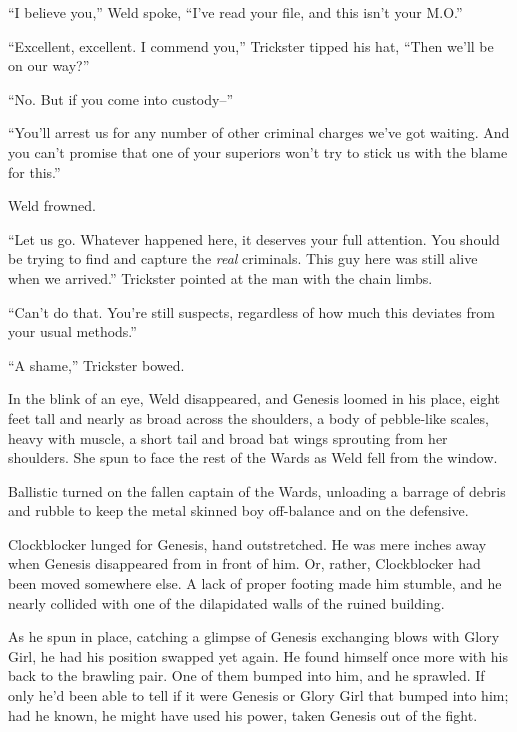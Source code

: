 ``I believe you,'' Weld spoke, ``I've read your file, and this isn't your M.O.''



``Excellent, excellent.  I commend you,'' Trickster tipped his hat, ``Then we'll be on our way?''



``No.  But if you come into custody--''



``You'll arrest us for any number of other criminal charges we've got waiting.  And you can't promise that one of your superiors won't try to stick us with the blame for this.''



Weld frowned.



``Let us go.  Whatever happened here, it deserves your full attention.  You should be trying to find and capture the \emph{real} criminals.  This guy here was still alive when we arrived.''  Trickster pointed at the man with the chain limbs.



``Can't do that.  You're still suspects, regardless of how much this deviates from your usual methods.''



``A shame,'' Trickster bowed.



In the blink of an eye, Weld disappeared, and Genesis loomed in his place, eight feet tall and nearly as broad across the shoulders, a body of pebble-like scales, heavy with muscle, a short tail and broad bat wings sprouting from her shoulders.  She spun to face the rest of the Wards as Weld fell from the window.



Ballistic turned on the fallen captain of the Wards, unloading a barrage of debris and rubble to keep the metal skinned boy off-balance and on the defensive.



Clockblocker lunged for Genesis, hand outstretched.  He was mere inches away when Genesis disappeared from in front of him.  Or, rather, Clockblocker had been moved somewhere else.  A lack of proper footing made him stumble, and he nearly collided with one of the dilapidated walls of the ruined building.



As he spun in place, catching a glimpse of Genesis exchanging blows with Glory Girl, he had his position swapped yet again.  He found himself once more with his back to the brawling pair.  One of them bumped into him, and he sprawled.  If only he'd been able to tell if it were Genesis or Glory Girl that bumped into him; had he known, he might have used his power, taken Genesis out of the fight.



